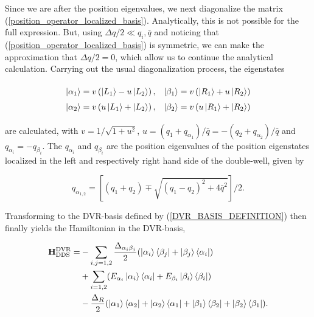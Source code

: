 \documentclass[preprint]{revtex4-2}
\begin{document}
Since we are after the position eigenvalues, we next diagonalize the matrix (\ref{position_operator_localized_basis}).
Analytically, this is not possible for the full expression. But, using $\Delta q/2 \ll q_i,\bar{q}$ and
noticing that (\ref{position_operator_localized_basis}) is symmetric, we can make the approximation that
$\Delta q/2 =0$, which allow us to continue the analytical calculation.
Carrying out the usual diagonalization process, the eigenstates 

\begin{equation}\label{DVR_BASIS_DEFINITION}
\def\arraystretch{1.5}
\begin{array}{c c}
    \ket{\alpha_1}=v\left(\ket{L_1}-u\ket{L_2}\right),
    & \ket{\beta_1}=v\left(\ket{R_1}+u\ket{R_2}\right)\\
    \ket{\alpha_2}=v\left(u\ket{L_1}+\ket{L_2}\right),
    & \ket{\beta_2}=v\left(u\ket{R_1}+\ket{R_2}\right) \\
\end{array}
\end{equation}

are calculated, with $v=1/\sqrt{1+u^2}$, $u=(q_1+q_{\alpha_1})/\bar{q}=-(q_2+q_{\alpha_2})/\bar{q}$ and
$q_{\alpha_i}=-q_{\beta_i}$. The $q_{\alpha_i}$ and $q_{\beta_i}$ are the position eigenvalues 
of the position eigenstates localized in the left and respectively right hand side of the double-well,
given by 

\begin{equation}\label{DDS_POSITION_EIGENVALUES}
    q_{\alpha_{1,2}} = \left[ (q_1+q_2) \mp \sqrt{(q_1-q_2)^2 + 4\bar{q}^2} \right]/2.
\end{equation}

Transforming to the DVR-basis defined by (\ref{DVR_BASIS_DEFINITION}) then finally yields the 
Hamiltonian in the DVR-basis,

\begin{equation}\label{DDS_HAMILTONIAN_DVR_BASIS}
\begin{split}
    \mathbf{H}_{\text{DDS}}^{\text{DVR}} = &- \sum_{i,j=1,2}\frac{\Delta_{\alpha_i\beta_j}}{2}(\ket{\alpha_i}\bra{\beta_j}+\ket{\beta_j}\bra{\alpha_i}) \\
    &+ \sum_{i=1,2}(E_{\alpha_i}\ket{\alpha_i}\bra{\alpha_i}+E_{\beta_i}\ket{\beta_i}\bra{\beta_i}) \\
    &- \frac{\Delta_R}{2}(\ket{\alpha_1}\bra{\alpha_2}+\ket{\alpha_2}\bra{\alpha_1}+\ket{\beta_1}\bra{\beta_2}+\ket{\beta_2}\bra{\beta_1}).
\end{split}
\end{equation}
\end{document}
